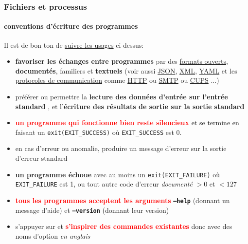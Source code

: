 \documentclass[xcolor=svgnames,final,smaller,a4]{beamer}
\begin{document}
\begin{frame}
  \frametitle{Fichiers et processus}
  \framesubtitle{conventions d'écriture des programmes}

  Il est de bon ton de \href{https://softwareengineering.stackexchange.com/a/307472/40065}{suivre les usages} ci-dessus:

  \begin{relsize}{-1}
    
  \begin{itemize}

    \item \textbf{favoriser les échanges entre programmes} par des
      \href{https://fr.wikipedia.org/wiki/Format_ouvert}{formats
        ouverts}, \textbf{documentés}, familiers et \textbf{textuels}
      (voir aussi \href{https://json.org/}{JSON},
      \href{https://fr.wikipedia.org/wiki/Extensible_Markup_Language}{XML},
      \href{https://yaml.org/}{YAML} et les \href{https://fr.wikipedia.org/wiki/Protocole_de_communication}{protocoles de communication} comme \href{https://fr.wikipedia.org/wiki/Hypertext_Transfer_Protocol}{HTTP} ou \href{https://fr.wikipedia.org/wiki/Simple_Mail_Transfer_Protocol}{SMTP} ou \href{https://fr.wikipedia.org/wiki/Common_Unix_Printing_System}{CUPS} ...)


    \item préférer ou permettre la \textbf{lecture des données
      d'entrée sur l'entrée standard} {}, et l'\textbf{écriture des résultats de sortie
      sur la sortie standard} {}


  \item \textcolor{red}{\textbf{un programme qui fonctionne bien reste
      silencieux}} et se termine en faisant un
    \texttt{exit(EXIT\_SUCCESS)} où \texttt{EXIT\_SUCCESS} est 0.

    \item en cas d'erreur ou anomalie, produire un message d'erreur
      sur la sortie d'erreur standard

  \item \textbf{un programme échoue} avec au moins un
    \texttt{exit(EXIT\_FAILURE)} où \texttt{EXIT\_FAILURE} est 1,
    ou tout autre code d'erreur \textit{documenté} $>0$ et $<127$

  \item \textcolor{red}{\textbf{tous les programmes acceptent les arguments}} \textbf{\texttt{--help}}
    (donnant un message d'aide) et \textbf{\texttt{--version}} (donnant leur
    version)
    
      \item s'appuyer sur et \textcolor{red}{\textbf{s'inspirer des commandes
        existantes}} donc avec des noms d'option \textit{en anglais}

  \end{itemize}
  \end{relsize}
\end{frame}
\end{document}
